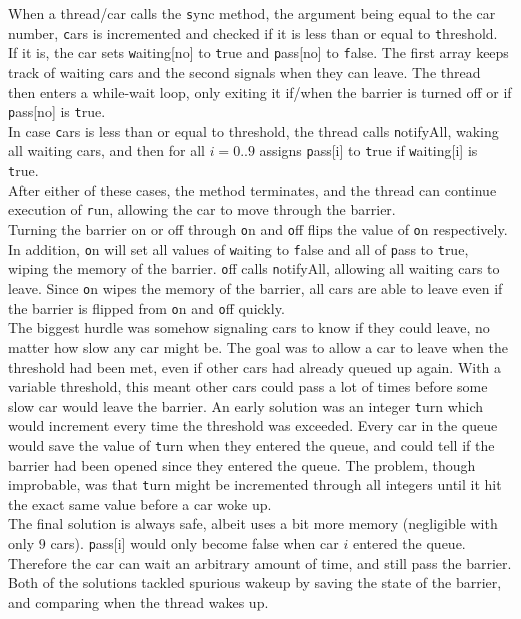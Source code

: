 When a thread/car calls the {\texttt sync} method, the argument being equal to the car number, {\texttt cars} is incremented and checked if it is less than or equal to {\texttt threshold}.\\
If it is, the car sets {\texttt waiting[no]} to {\texttt true} and {\texttt pass[no]} to {\texttt false}. The first array keeps track of waiting cars and the second signals when they can leave. The thread then enters a while-wait loop, only exiting it if/when the barrier is turned off or if {\texttt pass[no]} is {\texttt true}.\\
In case {\texttt cars} is less than or equal to {\textt threshold}, the thread calls {\texttt notifyAll}, waking all waiting cars, and then for all $i=0..9$ assigns {\texttt pass[i]} to {\texttt true} if {\texttt waiting[i]} is {\texttt true}.\\
After either of these cases, the method terminates, and the thread can continue execution of {\texttt run}, allowing the car to move through the barrier.\\

Turning the barrier on or off through {\texttt on} and {\texttt off} flips the value of {\texttt on} respectively. In addition, {\texttt on} will set all values of {\texttt waiting} to {\texttt false} and all of {\texttt pass} to {\texttt true}, wiping the memory of the barrier. {\texttt off} calls {\texttt notifyAll}, allowing all waiting cars to leave. Since {\texttt on} wipes the memory of the barrier, all cars are able to leave even if the barrier is flipped from {\texttt on} and {\texttt off} quickly.\\

The biggest hurdle was somehow signaling cars to know if they could leave, no matter how slow any car might be. The goal was to allow a car to leave when the threshold had been met, even if other cars had already queued up again. With a variable threshold, this meant other cars could pass a lot of times before some slow car would leave the barrier. An early solution was an integer {\texttt turn} which would increment every time the threshold was exceeded. Every car in the queue would save the value of {\texttt turn} when they entered the queue, and could tell if the barrier had been opened since they entered the queue. The problem, though improbable, was that {\texttt turn} might be incremented through all integers until it hit the exact same value before a car woke up.\\

The final solution is always safe, albeit uses a bit more memory (negligible with only $9$ cars). {\texttt pass[i]} would only become {\textt false} when car $i$ entered the queue. Therefore the car can wait an arbitrary amount of time, and still pass the barrier. Both of the solutions tackled spurious wakeup by saving the state of the barrier, and comparing when the thread wakes up.\\

